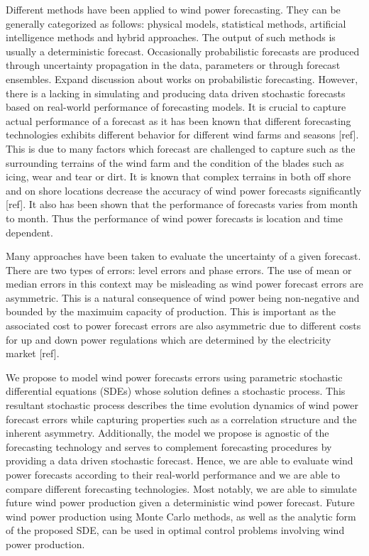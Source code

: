 \documentclass[11pt]{article}
\begin{document}
Different methods have been applied to wind power forecasting. They can be generally categorized as follows: physical models, statistical methods, artificial intelligence methods and hybrid approaches. The output of such methods is usually a deterministic forecast. Occasionally probabilistic forecasts are produced through uncertainty propagation in the data, parameters or through forecast ensembles. {\color{red} Expand discussion about works on probabilistic forecasting.} However, there is a lacking in simulating and producing data driven stochastic forecasts based on real-world performance of forecasting models. It is crucial to capture actual performance of a forecast as it has been known that different forecasting technologies exhibits different behavior for different wind farms and seasons [ref]. This is due to many factors which forecast are challenged to capture such as the surrounding terrains of the wind farm and the condition of the blades such as icing, wear and tear or dirt. It is known that complex terrains in both off shore and on shore locations decrease the accuracy of wind power forecasts significantly [ref]. It also has been shown that the performance of forecasts varies from month to month. Thus the performance of wind power forecasts is location and time dependent.

Many approaches have been taken to evaluate the uncertainty of a given forecast. There are two types of errors: level errors and phase errors. The use of mean or median errors in this context may be misleading as wind power forecast errors are asymmetric. This is a natural consequence of wind power being non-negative and bounded by the maximuim capacity of production. This is important as the associated cost to power forecast errors are also asymmetric due to different costs for up and down  power regulations which are determined by the electricity market [ref].

We propose to model wind power forecasts errors using parametric stochastic differential equations (SDEs) whose solution defines a stochastic process. This resultant stochastic process describes the time evolution dynamics of wind power forecast errors while capturing properties such as a correlation structure and the inherent asymmetry. Additionally, the model we propose is agnostic of the forecasting technology and serves to complement forecasting procedures by providing a data driven stochastic forecast. Hence, we are able to evaluate wind power forecasts according to their real-world performance and we are able to compare different forecasting technologies. Most notably, we are able to simulate future wind power production given a deterministic wind power forecast. Future wind power production using Monte Carlo methods, as well as the analytic form of the proposed SDE, can be used in optimal control problems involving wind power production.
\end{document}
